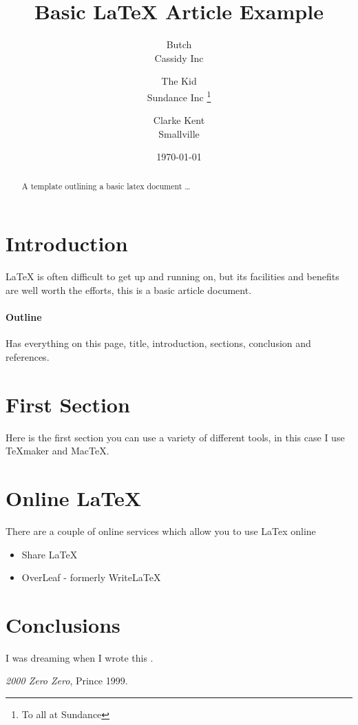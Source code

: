 \documentclass{article}
\title{Basic \LaTeX{} Article Example}
\author{Butch  \\
	Cassidy Inc  \\
	\and 
	The Kid \\
	Sundance Inc \thanks{To all at Sundance}\\
	\and 
	Clarke Kent\\
	Smallville\\
	}
\date{\today}
\begin{document}
\maketitle

\begin{abstract}
A template outlining a basic latex document \ldots 
\end{abstract}

\section{Introduction}
\LaTeX{} is often difficult to get up and running on, but its facilities and benefits are well worth the efforts, this is a basic article document.

\paragraph{Outline}
Has everything on this page, title, introduction, sections, conclusion and references.

\newpage   

\section{First Section}
Here is the first section you can use a variety of different tools, in this case I use TeXmaker and MacTeX.

\section{Online LaTeX}
There are a couple of online services which allow you to use LaTex online
\begin{itemize}
\item Share LaTeX
\item OverLeaf - formerly WriteLaTeX
\end{itemize}

\section{Conclusions}\label{conclusions}
I was dreaming when I wrote this \cite{prince}.

\begin{thebibliography}{9}
 \emph{2000 Zero Zero},
Prince 1999. 
\end{thebibliography}
\end{document}
